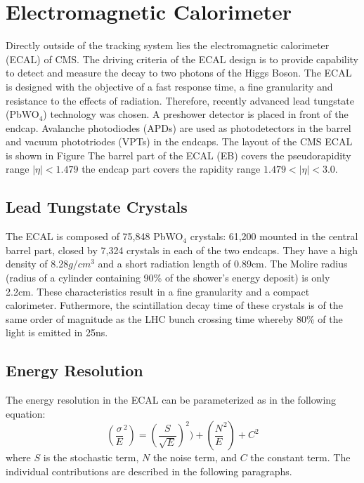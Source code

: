  \section{Electromagnetic Calorimeter}
Directly outside of the tracking system lies the electromagnetic calorimeter 
(ECAL) of CMS. The driving criteria of the ECAL design is to provide capability
to detect and measure the decay to two photons of the Higgs Boson. The 
ECAL is designed with the objective of a
fast response time, a fine granularity and resistance to the effects of radiation.
Therefore, recently advanced lead tungstate (PbWO$_{4}$) technology was chosen. 
A preshower detector is placed in front of the endcap. Avalanche photodiodes (APDs)
are used as photodetectors in the barrel and vacuum phototriodes (VPTs) in the
endcaps.
The layout of the CMS ECAL is shown in Figure %
The barrel part of the ECAL (EB) covers the pseudorapidity range $|\eta|<1.479$
the endcap part covers the rapidity range $1.479<|\eta|<3.0$.
\subsection{Lead Tungstate Crystals}
The ECAL is composed of 75,848 PbWO$_{4}$ crystals: 61,200 mounted in the 
central barrel part, closed by 7,324 crystals in each of the two endcaps. They 
have a high density of 8.28$g/cm^{3}$ and a short radiation length of 0.89cm. 
The Molire radius (radius of a cylinder containing 90\% of the shower's energy deposit) 
is only 2.2cm. These characteristics result in a fine granularity and a compact
calorimeter. Futhermore, the scintillation decay time of these crystals is of the
same order of magnitude as the LHC bunch crossing time whereby 80\% of 
the light is emitted in 25ns. 
\subsection{Energy Resolution}
The energy resolution in the ECAL can be parameterized as in the following equation:
\begin{displaymath}
(\frac{\sigma}{E}^{2})=(\frac{S}{\sqrt{E}})^{2})+(\frac{N}{E}^{2})+C^{2}
\end{displaymath}
where $S$ is the stochastic term, $N$ the noise term, and $C$ the constant term. 
The individual contributions are described in the following paragraphs.

